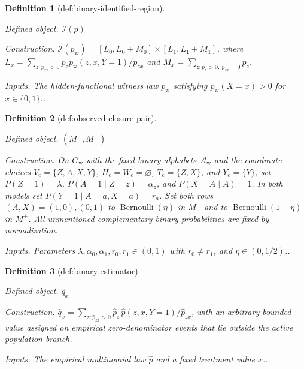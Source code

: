 \documentclass{article}
\newtheorem{definition}{Definition}
\begin{document}
\begin{definition}[def:binary-identified-region]\label{def:binary-identified-region}
\par\smallskip\noindent\emph{Defined object.} \(\mathcal I(p)\)
\par\smallskip\noindent\emph{Construction.} \(\mathcal I(p_{\mathrm w})=[L_0,L_0+M_0]\times[L_1,L_1+M_1]\), where \(L_x=\sum_{z:p_{zx}>0}p_zp_{\mathrm w}(z,x,Y=1)/p_{zx}\) and \(M_x=\sum_{z:p_z>0,\ p_{zx}=0}p_z\).
\par\smallskip\noindent\emph{Inputs.} The hidden-functional witness law \(p_{\mathrm w}\) satisfying \(p_{\mathrm w}(X=x)>0\) for \(x\in\{0,1\}\)..
\end{definition}

\begin{definition}[def:observed-closure-pair]\label{def:observed-closure-pair}
\par\smallskip\noindent\emph{Defined object.} \((M^-,M^+)\)
\par\smallskip\noindent\emph{Construction.} On \(G_{\mathrm w}\) with the fixed binary alphabets \(\mathcal A_{\mathrm w}\) and the coordinate choices \(V_{\mathrm c}=\{Z,A,X,Y\}\), \(H_{\mathrm c}=W_{\mathrm c}=\varnothing\), \(T_{\mathrm c}=\{Z,X\}\), and \(Y_{\mathrm c}=\{Y\}\), set \(P(Z=1)=\lambda\), \(P(A=1\mid Z=z)=\alpha_z\), and \(P(X=A\mid A)=1\). In both models set \(P(Y=1\mid A=a,X=a)=r_a\). Set both rows \((A,X)=(1,0),(0,1)\) to \(\operatorname{Bernoulli}(\eta)\) in \(M^-\) and to \(\operatorname{Bernoulli}(1-\eta)\) in \(M^+\). All unmentioned complementary binary probabilities are fixed by normalization.
\par\smallskip\noindent\emph{Inputs.} Parameters \(\lambda,\alpha_0,\alpha_1,r_0,r_1\in(0,1)\) with \(r_0\ne r_1\), and \(\eta\in(0,1/2)\)..
\end{definition}

\begin{definition}[def:binary-estimator]\label{def:binary-estimator}
\par\smallskip\noindent\emph{Defined object.} \(\widehat q_x\)
\par\smallskip\noindent\emph{Construction.} \(\widehat q_x=\sum_{z:\widehat p_{zx}>0}\widehat p_z\,\widehat p(z,x,Y=1)/\widehat p_{zx}\), with an arbitrary bounded value assigned on empirical zero-denominator events that lie outside the active population branch.
\par\smallskip\noindent\emph{Inputs.} The empirical multinomial law \(\widehat p\) and a fixed treatment value \(x\)..
\end{definition}
\end{document}
